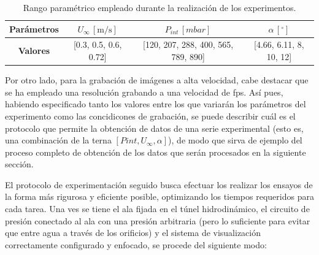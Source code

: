 \begin{table}
\centering
\begin{tabular}{c || c c c}
\textbf{Parámetros} & $U_{\infty}\,\left[\mathrm{m/s}\right]$ & $P_{int}\,\left[mbar\right]$ & $\alpha\,\left[^{\circ}\right]$  \\
\hline \hline
\textbf{Valores} & [0.3, 0.5, 0.6, 0.72] & [120, 207, 288, 400, 565, 789, 890] & [4.66, 6.11, 8, 10, 12] \\
\hline
\end{tabular}
\caption{Rango paramétrico empleado durante la realización de los experimentos.}
\end{table}

Por otro lado, para la grabación de imágenes a alta velocidad, cabe destacar que se ha empleado una resolución %
grabando a una velocidad de %
fps. Así pues, habiendo especificado tanto los valores entre los que variarán los parámetros del experimento como las concidicones de grabación, se puede describir cuál es el protocolo que permite la obtención de datos de una serie experimental (esto es, una combinación de la terna $\left[Pint,U_{\infty},\alpha\right]$), de modo que sirva de ejemplo del proceso completo de obtención de los datos que serán procesados en la siguiente sección. 

El protocolo de experimentación seguido busca efectuar los realizar los ensayos de la forma más rigurosa y eficiente posible, optimizando los tiempos requeridos para cada tarea. Una ves se tiene el ala fijada en el túnel hidrodinámico, el circuito de presión conectado al ala con una presión arbitraria (pero lo suficiente para evitar que entre agua a través de los orificios) y el sistema de visualización correctamente configurado y enfocado, se procede del siguiente modo:

